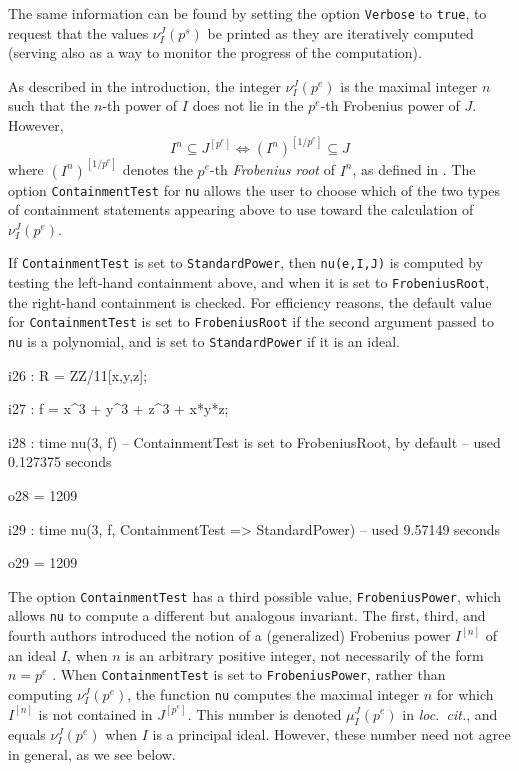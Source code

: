 \documentclass{amsart}
\begin{document}
\noindent The same information can be found by setting the option \texttt{Verbose} to \texttt{true}, to request that the values $\nu_I^J(p^s)$ be printed as they are iteratively computed (serving also as a way to monitor the progress of the computation).

As described in the introduction, the integer $\nu_I^J(p^e)$ is the maximal integer $n$ such that the $n$-th power of $I$ does not lie in the $p^e$-th Frobenius power of $J$.  However,
\begin{equation*}
  I^n \subseteq J^{[p^e]} \Longleftrightarrow (I^n)^{[1/p^e]} \subseteq J
\end{equation*}
where $(I^n)^{[1/p^e]}$ denotes the $p^e$-th \emph{Frobenius root} of $I^n$, as defined in \cite{BlickleMustataSmithDiscretenessAndRationalityOfFThresholds}.
The option \texttt{ContainmentTest} for \texttt{nu} allows the user to choose which of the two types of containment statements appearing above to use toward the calculation of $\nu_I^J(p^e)$.

If \texttt{ContainmentTest} is set to \texttt{StandardPower}, then \texttt{nu(e,I,J)} is computed by testing the left-hand containment above, and when it is set to \texttt{FrobeniusRoot}, the right-hand containment is checked.
For efficiency reasons, the default value for \texttt{ContainmentTest} is set to  \texttt{FrobeniusRoot} if the second argument passed to \texttt{nu} is a polynomial, and is set to \texttt{StandardPower} if it is an ideal.

\medskip
{\small
{}
\begin{MyVerbatim}
i26 : R = ZZ/11[x,y,z];

i27 : f = x^3 + y^3 + z^3 + x*y*z;

i28 : time nu(3, f) -- ContainmentTest is set to FrobeniusRoot, by default
     -- used 0.127375 seconds

o28 = 1209

i29 : time nu(3, f, ContainmentTest => StandardPower)
     -- used 9.57149 seconds

o29 = 1209
\end{MyVerbatim}
}
\medskip


The option \texttt{ContainmentTest} has a third possible value, \texttt{FrobeniusPower}, which allows \texttt{nu} to compute a different but analogous invariant.
The first, third, and fourth authors introduced the notion of a (generalized) Frobenius power $I^{[n]}$ of an ideal $I$, when $n$ is an arbitrary positive integer, not necessarily of the form $n = p^e$ \cite{hernandez+etal.frobenius_powers}.
When \texttt{ContainmentTest} is set to \texttt{FrobeniusPower}, rather than  computing $\nu_I^J(p^e)$, the function \texttt{nu} computes the maximal integer $n$ for which $I^{[n]}$ is not contained in $J^{[p^e]}$.  This number is denoted $\mu_I^J(p^e)$ in \emph{loc.~cit.}, and equals $\nu_I^J(p^e)$ when $I$ is a principal ideal.  However, these number need not agree in general, as we see below.
\end{document}
